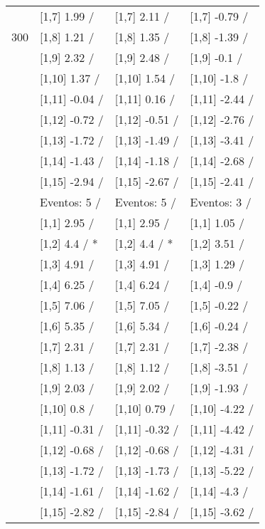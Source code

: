 \begin{table}
\begin{tabular}[t]{llll}
 & {}[1,7] 1.99  / & {}[1,7] 2.11  / & {}[1,7] -0.79  /\\
300 & {}[1,8] 1.21  / & {}[1,8] 1.35  / & {}[1,8] -1.39  /\\
\addlinespace
 & {}[1,9] 2.32  / & {}[1,9] 2.48  / & {}[1,9] -0.1  /\\
 & {}[1,10] 1.37  / & {}[1,10] 1.54  / & {}[1,10] -1.8  /\\
 & {}[1,11] -0.04  / & {}[1,11] 0.16  / & {}[1,11] -2.44  /\\
 & {}[1,12] -0.72  / & {}[1,12] -0.51  / & {}[1,12] -2.76  /\\
 & {}[1,13] -1.72  / & {}[1,13] -1.49  / & {}[1,13] -3.41  /\\
\addlinespace
 & {}[1,14] -1.43  / & {}[1,14] -1.18  / & {}[1,14] -2.68  /\\
 & {}[1,15] -2.94  / & {}[1,15] -2.67  / & {}[1,15] -2.41  /\\
 & Eventos:  5 / & Eventos:  5 / & Eventos:  3 /\\
 & {}[1,1] 2.95  / & {}[1,1] 2.95  / & {}[1,1] 1.05  /\\
 & {}[1,2] 4.4  / * & {}[1,2] 4.4  / * & {}[1,2] 3.51  /\\
\addlinespace
 & {}[1,3] 4.91  / & {}[1,3] 4.91  / & {}[1,3] 1.29  /\\
 & {}[1,4] 6.25  / & {}[1,4] 6.24  / & {}[1,4] -0.9  /\\
 & {}[1,5] 7.06  / & {}[1,5] 7.05  / & {}[1,5] -0.22  /\\
 & {}[1,6] 5.35  / & {}[1,6] 5.34  / & {}[1,6] -0.24  /\\
 & {}[1,7] 2.31  / & {}[1,7] 2.31  / & {}[1,7] -2.38  /\\
\addlinespace
500 & {}[1,8] 1.13  / & {}[1,8] 1.12  / & {}[1,8] -3.51  /\\
 & {}[1,9] 2.03  / & {}[1,9] 2.02  / & {}[1,9] -1.93  /\\
 & {}[1,10] 0.8  / & {}[1,10] 0.79  / & {}[1,10] -4.22  /\\
 & {}[1,11] -0.31  / & {}[1,11] -0.32  / & {}[1,11] -4.42  /\\
 & {}[1,12] -0.68  / & {}[1,12] -0.68  / & {}[1,12] -4.31  /\\
\addlinespace
 & {}[1,13] -1.72  / & {}[1,13] -1.73  / & {}[1,13] -5.22  /\\
 & {}[1,14] -1.61  / & {}[1,14] -1.62  / & {}[1,14] -4.3  /\\
 & {}[1,15] -2.82  / & {}[1,15] -2.84  / & {}[1,15] -3.62  /\\
\bottomrule
\end{tabular}
\end{table}
